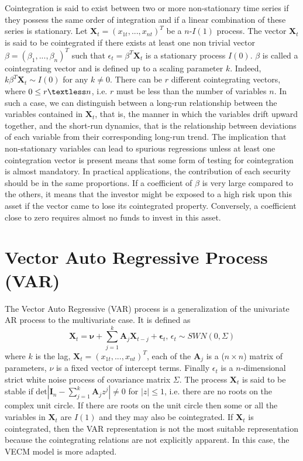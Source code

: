\documentclass[11pt,a4,twosided,singlespacing,titlepagenumber=on]{scrreprt}
\numberwithin{equation}{chapter} %
\theoremstyle{remark}
\newcommand{\matr}[1]{\mathbf{#1}}
\begin{document}
Cointegration is said to exist between two or more non-stationary time series if they possess the same order of integration and if a linear combination of these series is stationary. Let $\matr{X}_t = (x_{1t},...,x_{nt})^T$ be a $n$-$I(1)$ process. The vector $\matr{X}_t$ is said to be cointegrated if there exists at least one non trivial vector $\beta = (\beta_1,...,\beta_n)^T$ such that $\epsilon_t = \beta^T \matr{X}_t$ is a stationary process $I(0)$. $\beta$ is called a cointegrating vector and is defined up to a scaling parameter $k$. Indeed, $k\beta^T\matr{X}_t \sim I(0)$ for any $k \neq 0$. There can be $r$ different cointegrating vectors, where $0 \leq r \textless n$, i.e. $r$ must be less than the number of variables $n$. In such a case, we can distinguish between a long-run relationship between the variables contained in $\matr{X}_t$, that is, the manner in which the variables drift upward together, and the short-run dynamics, that is the relationship between deviations of each variable from their corresponding long-run trend. The implication that non-stationary variables can lead to spurious regressions unless at least one cointegration vector is present means that some form of testing for cointegration is almost mandatory. In practical applications, the contribution of each security should be in the same proportions. If a coefficient of $\beta$ is very large compared to the others, it means that the investor might be exposed to a high risk upon this asset if the vector came to lose its cointegrated property. Conversely, a coefficient close to zero requires almost no funds to invest in this asset.

\section{Vector Auto Regressive Process (VAR)}
The Vector Auto Regressive (VAR) process is a generalization of the univariate AR process to the multivariate case. It is defined as
\begin{equation}
\matr{X}_t = \matr{\nu} + \sum_{j=1}^k \matr{A}_j \matr{X}_{t-j} + \matr{\epsilon}_t \text{, } \epsilon_t \sim SWN(0, \Sigma)
\end{equation}
where $k$ is the lag, $\matr{X}_t = (x_{1t},...,x_{nt})^T$, each of the $\matr{A}_j$ is a ($n \times n$) matrix of parameters, $\nu$ is a fixed vector of intercept terms. Finally $\epsilon_t$ is a $n$-dimensional strict white noise process of covariance matrix $\Sigma$. The process $\matr{X}_t$ is said to be stable if $\text{det}|\matr{I}_n - \sum_{j=1}^k \matr{A}_j z^j| \neq 0$ for $|z|\leq1$, i.e. there are no roots on the complex unit circle. If there are roots on the unit circle then some or all the variables in $\matr{X}_t$ are $I(1)$ and they may also be cointegrated. If $\matr{X}_t$ is cointegrated, then the VAR representation is not the most suitable representation because the cointegrating relations are not explicitly apparent. In this case, the VECM model is more adapted.
\end{document}
